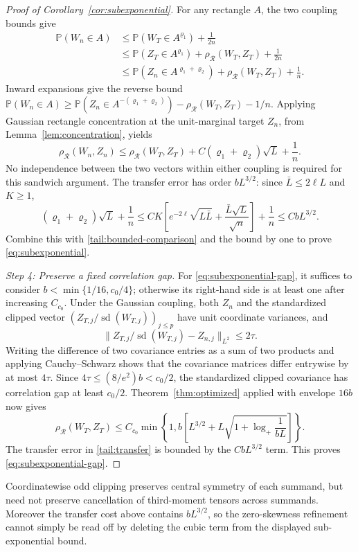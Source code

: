 \documentclass[11pt,letterpaper]{article}
\newif\ifshowrev
\newcommand{\rs}[1]{\ifshowrev{\color{revblue}#1}\else#1\fi}
\newif\ifshowpass
\newcommand{\pass}[1]{\ifshowpass{\color{revblue}%
\hypersetup{linkcolor=revblue,citecolor=revblue,urlcolor=revblue}#1}\else#1\fi}
\newif\ifshowskill
\newcommand{\sks}[1]{\ifshowskill{\color{revblue}#1}\else#1\fi}
\theoremstyle{remark}
\newcommand{\Pp}{\mathbb P}
\newcommand{\rh}{\rho_{\mathcal R}}
\begin{document}
\begin{proof}[Proof of Corollary~\ref{cor:subexponential}]
For any rectangle \(A\), the two coupling bounds give
\begin{align*}
 \Pp(W_n\in A)
 &\le\Pp(W_T\in A^{\sks{\varrho_1}})+\frac1{2n}\\
 &\le\Pp(Z_T\in A^{\sks{\varrho_1}})+\rh(W_T,Z_T)+\frac1{2n}\\
 &\le\Pp(Z_n\in A^{\sks{\varrho_1}+\sks{\varrho_2}})+\rh(W_T,Z_T)+\frac1n.
\end{align*}
Inward expansions give the reverse bound
\(\Pp(W_n\in A)\ge\Pp(Z_n\in A^{-(\sks{\varrho_1}+\sks{\varrho_2})})
-\rh(W_T,Z_T)-1/n\). Applying Gaussian rectangle concentration at
the unit-marginal target \(Z_n\), from Lemma~\ref{lem:concentration}, yields
\begin{equation}
 \rh(W_n,Z_n)\le\rh(W_T,Z_T)
       +C(\sks{\varrho_1}+\sks{\varrho_2})\sqrt L+\frac1n.
 \label{tail:transfer}
\end{equation}
No independence between the two vectors within either coupling is
required for this sandwich argument.
The transfer error has order \(bL^{3/2}\): since
\(\sks{\bar L}\le2\ell L\) and \(K\ge1\),
\[
 (\sks{\varrho_1}+\sks{\varrho_2})\sqrt L+\frac1n
 \le CK\left[e^{-2\ell}\sqrt{L\sks{\bar L}}
                     +\frac{\sks{\bar L}\sqrt L}{\sqrt n}\right]+\frac1n
 \le CbL^{3/2}.
\]
Combine this with \eqref{tail:bounded-comparison} and the bound by one
to prove \eqref{eq:subexponential}.

\emph{Step 4: Preserve a fixed correlation gap.}
For \eqref{eq:subexponential-gap}, it suffices to consider
\(b<\min\{1/16,c_0/4\}\); otherwise its right-hand side is at
least one after increasing \(C_{c_0}\).
Under the Gaussian coupling, both \(Z_n\) and the standardized clipped
vector \((Z_{T,j}/\sks{\operatorname{sd}(W_{T,j})})_{j\le p}\) have unit coordinate variances, and
\[
 \|Z_{T,j}/\sks{\operatorname{sd}(W_{T,j})}-Z_{n,j}\|_{L^2}\le2\tau.
\]
Writing the difference of two covariance entries as a sum of two
products and applying Cauchy--Schwarz shows that the covariance matrices
differ entrywise by at most \(4\tau\). Since
\(4\tau\le(8/e^2)b<c_0/2\), the standardized clipped covariance
has correlation gap at least \(c_0/2\).
Theorem~\ref{thm:optimized} applied with envelope \(16b\) now gives
\[
 \rh(W_T,Z_T)\le C_{c_0}\min\left\{1,
 b\left[L^{3/2}+L\sqrt{1+\log_+\frac1{bL}}\right]\right\}.
\]
The transfer error in \eqref{tail:transfer} is bounded by the
\(CbL^{3/2}\) term. This proves \eqref{eq:subexponential-gap}.
\end{proof}

Coordinatewise odd clipping preserves central symmetry of each \rs{summand},
but need not preserve cancellation of third\pass{-moment} tensors across \rs{summands}.
Moreover the transfer cost above contains \(bL^{3/2}\), so the
zero-skewness refinement cannot simply be read off by deleting the
cubic term from the displayed sub-exponential bound.
\end{document}
